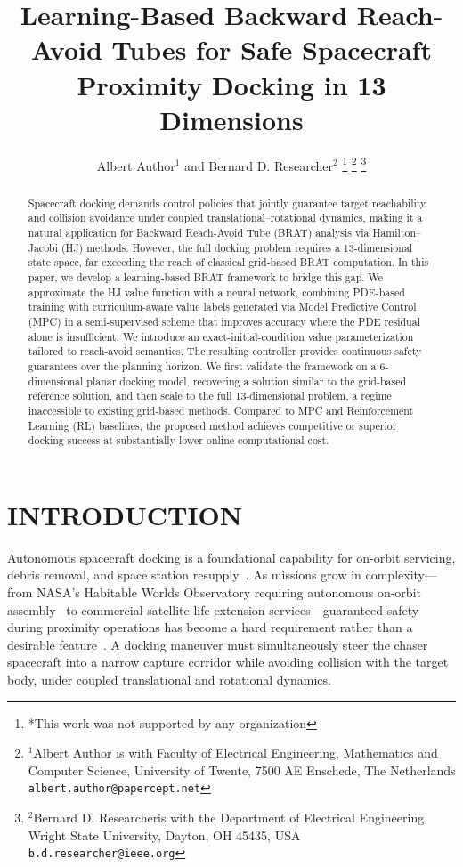 \documentclass[letterpaper, 10 pt, conference]{ieeeconf}
\title{\LARGE \bf
Learning-Based Backward Reach-Avoid Tubes for Safe Spacecraft Proximity Docking in 13 Dimensions
}
\author{Albert Author$^{1}$ and Bernard D. Researcher$^{2}$%
\thanks{*This work was not supported by any organization}%
\thanks{$^{1}$Albert Author is with Faculty of Electrical Engineering, Mathematics and Computer Science,
        University of Twente, 7500 AE Enschede, The Netherlands
        {\tt\small albert.author@papercept.net}}%
\thanks{$^{2}$Bernard D. Researcheris with the Department of Electrical Engineering, Wright State University,
        Dayton, OH 45435, USA
        {\tt\small b.d.researcher@ieee.org}}%
}
\begin{document}
\maketitle
\thispagestyle{empty}
\pagestyle{empty}

\begin{abstract}
Spacecraft docking demands control policies that jointly guarantee target reachability and collision avoidance under coupled translational--rotational dynamics, making it a natural application for Backward Reach-Avoid Tube (BRAT) analysis via Hamilton--Jacobi (HJ) methods. However, the full docking problem requires a 13-dimensional state space, far exceeding the reach of classical grid-based BRAT computation. In this paper, we develop a learning-based BRAT framework to bridge this gap. We approximate the HJ value function with a neural network, combining PDE-based training with curriculum-aware value labels generated via Model Predictive Control (MPC) in a semi-supervised scheme that improves accuracy where the PDE residual alone is insufficient. We introduce an exact-initial-condition value parameterization tailored to reach-avoid semantics. The resulting controller provides continuous safety guarantees over the planning horizon. We first validate the framework on a 6-dimensional planar docking model, recovering a solution similar to the grid-based reference solution, and then scale to the full 13-dimensional problem, a regime inaccessible to existing grid-based methods. Compared to MPC and Reinforcement Learning (RL) baselines, the proposed method achieves competitive or superior docking success at substantially lower online computational cost.
\end{abstract}

\section{INTRODUCTION}

Autonomous spacecraft docking is a foundational capability for on-orbit servicing, debris removal, and space station resupply~\cite{fehse2003}. As missions grow in complexity---from NASA's Habitable Worlds Observatory requiring autonomous on-orbit assembly~\cite{hwo2024} to commercial satellite life-extension services---guaranteed safety during proximity operations has become a hard requirement rather than a desirable feature~\cite{ventura2017}. A docking maneuver must simultaneously steer the chaser spacecraft into a narrow capture corridor while avoiding collision with the target body, under coupled translational and rotational dynamics.
\end{document}
